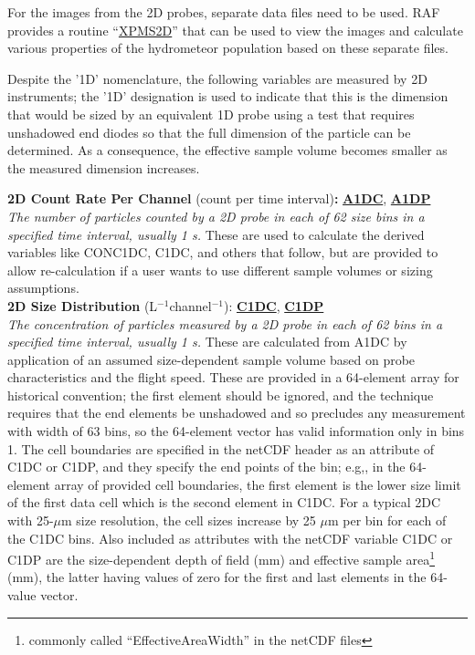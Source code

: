 For the images from the 2D probes, separate data files need to be
used. RAF provides a routine ``\href{https://www.eol.ucar.edu/software/xpms2d}{XPMS2D}''
that can be used to view the images and calculate various properties
of the hydrometeor population based on these separate  files.

\label{Despite-the-'1D'}Despite the '1D' nomenclature, the following
variables are measured by 2D instruments; the '1D' designation is
used to indicate that this is the dimension that would be sized by
an equivalent 1D probe using a test that requires unshadowed end diodes
so that the full dimension of the particle can be determined. As a
consequence, the effective sample volume becomes smaller as the measured
dimension increases.
\begin{hangparagraphs}
\textbf{2D Count Rate Per Channel }(count per time interval)\textbf{:}\textbf{
}\textbf{\uline{A1DC}}, \textbf{\uline{A1DP}}\\
\emph{The number of particles counted by a 2D
probe in each of 62 size bins in a specified time interval, usually
1 s.} These are used to calculate the derived variables like CONC1DC,
C1DC, and others that follow, but are provided to allow re-calculation
if a user wants to use different sample volumes or sizing assumptions.\\

\textbf{2D Size Distribution }(L$^{-1}$channel$^{-1}$):\textbf{
}\textbf{\uline{C1DC}}, \textbf{\uline{C1DP}}\\
\emph{The concentration of particles
measured by a 2D probe in each of 62 bins in a specified time interval,
usually 1 s.} These are calculated from A1DC by application of an
assumed size-dependent sample volume based on probe characteristics
and the flight speed. These are provided in a 64-element array for
historical convention; the first element should be ignored, and the
technique requires that the end elements be unshadowed and so precludes
any measurement with width of 63 bins, so the 64-element vector has
valid information only in bins 1. The cell boundaries
are specified in the netCDF header as an attribute of C1DC or C1DP,
and they specify the end points of the bin; e.g,, in the 64-element
array of provided cell boundaries, the first element is the lower
size limit of the first data cell which is the second element in C1DC.
For a typical 2DC with 25-$\mu$m size resolution, the cell sizes
increase by 25 $\mu$m per bin for each of the C1DC bins. Also included
as attributes with the netCDF variable C1DC or C1DP are the size-dependent
depth of field (mm) and effective sample area\footnote{commonly called ``EffectiveAreaWidth'' in the netCDF files}
(mm), the latter having values of zero for the first and last elements
in the 64-value vector. \\


\end{hangparagraphs}
